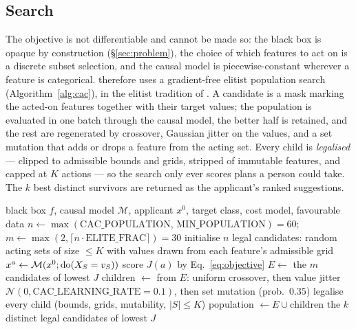 \subsection{Search}
The objective is not differentiable and cannot be made so: the black box is opaque
by construction (\S\ref{sec:problem}), the choice of which features to act on is a
discrete subset selection, and the causal model is piecewise-constant wherever a
feature is categorical. \cac{} therefore uses a gradient-free elitist population
search (Algorithm~\ref{alg:cac}), in the elitist tradition of
\citet{deb2002nsga}. A candidate is a mask marking the acted-on
features together with their target values; the population is evaluated in one
batch through the causal model, the better half is retained, and the rest are
regenerated by crossover, Gaussian jitter on the values, and a set mutation that
adds or drops a feature from the acting set. Every child is \emph{legalised} ---
clipped to admissible bounds and grids, stripped of immutable features, and capped
at $K$ actions --- so the search only ever scores plans a person could take. The
$k$ best distinct survivors are returned as the applicant's ranked suggestions.

\begin{algorithm}[t]
\caption{\cac{} action search for one rejected applicant.}
\label{alg:cac}
\begin{algorithmic}[1]
\Require black box $f$, causal model $\mathcal{M}$, applicant $x^{0}$, target class,
  cost model, favourable data
\State $n \gets \max(\text{CAC\_POPULATION},\,\text{MIN\_POPULATION}) = 60$;\quad
  $m \gets \max(2,\lceil n\cdot\text{ELITE\_FRAC}\rceil)=30$
\State initialise $n$ legal candidates: random acting sets of size $\le K$ with
  values drawn from each feature's admissible grid
    \State $x^{a} \gets \mathcal{M}(x^{0};\mathrm{do}(X_S=v_S))$
    \State score $J(a)$ by Eq.~\eqref{eq:objective}
  \EndFor
  \State $E \gets$ the $m$ candidates of lowest $J$
  \State children $\gets$ from $E$: uniform crossover, then value jitter
    $\mathcal{N}(0,\text{CAC\_LEARNING\_RATE}{=}0.1)$, then set mutation
    (prob.\ $0.35$)
  \State legalise every child (bounds, grids, mutability, $|S|\le K$)
  \State population $\gets E \cup \text{children}$
\EndFor
\State \Return the $k$ distinct legal candidates of lowest $J$
\end{algorithmic}
\end{algorithm}

